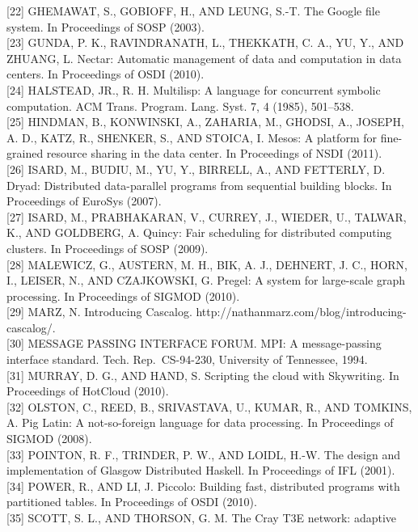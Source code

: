 \documentclass[
]{article}
\begin{document}
{[}22{]} GHEMAWAT, S., GOBIOFF, H., AND LEUNG, S.-T. The Google file
system. In Proceedings of SOSP (2003).\\
{[}23{]} GUNDA, P. K., RAVINDRANATH, L., THEKKATH, C. A., YU, Y., AND
ZHUANG, L. Nectar: Automatic management of data and computation in data
centers. In Proceedings of OSDI (2010).\\
{[}24{]} HALSTEAD, JR., R. H. Multilisp: A language for concurrent
symbolic computation. ACM Trans. Program. Lang. Syst. 7, 4 (1985),
501--538.\\
{[}25{]} HINDMAN, B., KONWINSKI, A., ZAHARIA, M., GHODSI, A., JOSEPH, A.
D., KATZ, R., SHENKER, S., AND STOICA, I. Mesos: A platform for
fine-grained resource sharing in the data center. In Proceedings of NSDI
(2011).\\
{[}26{]} ISARD, M., BUDIU, M., YU, Y., BIRRELL, A., AND FETTERLY, D.
Dryad: Distributed data-parallel programs from sequential building
blocks. In Proceedings of EuroSys (2007).\\
{[}27{]} ISARD, M., PRABHAKARAN, V., CURREY, J., WIEDER, U., TALWAR, K.,
AND GOLDBERG, A. Quincy: Fair scheduling for distributed computing
clusters. In Proceedings of SOSP (2009).\\
{[}28{]} MALEWICZ, G., AUSTERN, M. H., BIK, A. J., DEHNERT, J. C., HORN,
I., LEISER, N., AND CZAJKOWSKI, G. Pregel: A system for large-scale
graph processing. In Proceedings of SIGMOD (2010).\\
{[}29{]} MARZ, N. Introducing Cascalog.
http://nathanmarz.com/blog/introducing-cascalog/.\\
{[}30{]} MESSAGE PASSING INTERFACE FORUM. MPI: A message-passing
interface standard. Tech. Rep.~CS-94-230, University of Tennessee,
1994.\\
{[}31{]} MURRAY, D. G., AND HAND, S. Scripting the cloud with
Skywriting. In Proceedings of HotCloud (2010).\\
{[}32{]} OLSTON, C., REED, B., SRIVASTAVA, U., KUMAR, R., AND TOMKINS,
A. Pig Latin: A not-so-foreign language for data processing. In
Proceedings of SIGMOD (2008).\\
{[}33{]} POINTON, R. F., TRINDER, P. W., AND LOIDL, H.-W. The design and
implementation of Glasgow Distributed Haskell. In Proceedings of IFL
(2001).\\
{[}34{]} POWER, R., AND LI, J. Piccolo: Building fast, distributed
programs with partitioned tables. In Proceedings of OSDI (2010).\\
{[}35{]} SCOTT, S. L., AND THORSON, G. M. The Cray T3E network: adaptive
\end{document}
